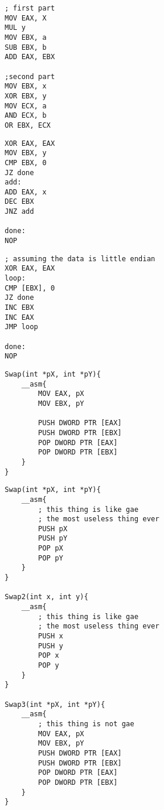 \documentclass[11pt,letterpaper]{article}
\begin{document}

\begin{verbatim}
; first part
MOV EAX, X
MUL y
MOV EBX, a
SUB EBX, b
ADD EAX, EBX

;second part
MOV EBX, x
XOR EBX, y
MOV ECX, a
AND ECX, b
OR EBX, ECX
\end{verbatim}

\pagebreak
{}
\begin{verbatim}
XOR EAX, EAX
MOV EBX, y
CMP EBX, 0
JZ done
add:	
ADD EAX, x
DEC EBX
JNZ add

done:
NOP
\end{verbatim}
\begin{verbatim}
; assuming the data is little endian
XOR EAX, EAX
loop: 
CMP [EBX], 0
JZ done
INC EBX
INC EAX
JMP loop

done:
NOP
\end{verbatim}

\begin{verbatim}
Swap(int *pX, int *pY){
	__asm{
		MOV EAX, pX
		MOV EBX, pY

		PUSH DWORD PTR [EAX]
		PUSH DWORD PTR [EBX]
		POP DWORD PTR [EAX]
		POP DWORD PTR [EBX]
	}
}
\end{verbatim}

\pagebreak

\begin{verbatim}
Swap(int *pX, int *pY){
	__asm{
		; this thing is like gae
		; the most useless thing ever
		PUSH pX
		PUSH pY
		POP pX
		POP pY
	}
}

Swap2(int x, int y){
	__asm{
		; this thing is like gae
		; the most useless thing ever
		PUSH x 
		PUSH y 
		POP x
		POP y
	}
}

Swap3(int *pX, int *pY){
	__asm{
		; this thing is not gae
		MOV EAX, pX
		MOV EBX, pY
		PUSH DWORD PTR [EAX]
		PUSH DWORD PTR [EBX]
		POP DWORD PTR [EAX]
		POP DWORD PTR [EBX]
	}
}
\end{verbatim}
\end{document}
